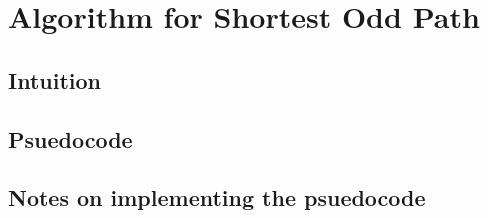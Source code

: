 \chapter{Algorithm for Shortest Odd Path}

\section{Intuition}

\section{Psuedocode}

\section{Notes on implementing the psuedocode}